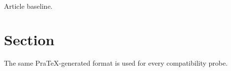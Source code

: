 \documentclass{article}
\begin{document}
Article baseline.

\section{Section}
The same PraTeX-generated format is used for every compatibility probe.
\end{document}
